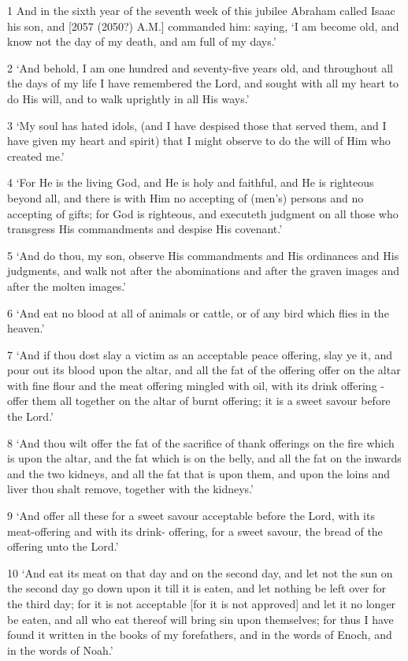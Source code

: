 \par 1 And in the sixth year of the seventh week of this jubilee Abraham called Isaac his son, and [2057 (2050?) A.M.] commanded him: saying, ‘I am become old, and know not the day of my death, and am full of my days.’
\par 2 ‘And behold, I am one hundred and seventy-five years old, and throughout all the days of my life I have remembered the Lord, and sought with all my heart to do His will, and to walk uprightly in all His ways.’
\par 3 ‘My soul has hated idols, (and I have despised those that served them, and I have given my heart and spirit) that I might observe to do the will of Him who created me.’
\par 4 ‘For He is the living God, and He is holy and faithful, and He is righteous beyond all, and there is with Him no accepting of (men's) persons and no accepting of gifts; for God is righteous, and executeth judgment on all those who transgress His commandments and despise His covenant.’
\par 5 ‘And do thou, my son, observe His commandments and His ordinances and His judgments, and walk not after the abominations and after the graven images and after the molten images.’
\par 6 ‘And eat no blood at all of animals or cattle, or of any bird which flies in the heaven.’
\par 7 ‘And if thou dost slay a victim as an acceptable peace offering, slay ye it, and pour out its blood upon the altar, and all the fat of the offering offer on the altar with fine flour and the meat offering mingled with oil, with its drink offering -offer them all together on the altar of burnt offering; it is a sweet savour before the Lord.’
\par 8 ‘And thou wilt offer the fat of the sacrifice of thank offerings on the fire which is upon the altar, and the fat which is on the belly, and all the fat on the inwards and the two kidneys, and all the fat that is upon them, and upon the loins and liver thou shalt remove, together with the kidneys.’
\par 9 ‘And offer all these for a sweet savour acceptable before the Lord, with its meat-offering and with its drink- offering, for a sweet savour, the bread of the offering unto the Lord.’
\par 10 ‘And eat its meat on that day and on the second day, and let not the sun on the second day go down upon it till it is eaten, and let nothing be left over for the third day; for it is not acceptable [for it is not approved] and let it no longer be eaten, and all who eat thereof will bring sin upon themselves; for thus I have found it written in the books of my forefathers, and in the words of Enoch, and in the words of Noah.’
